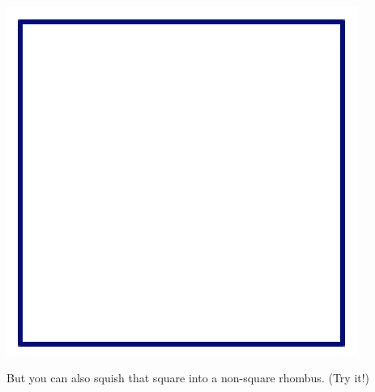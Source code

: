 \documentclass[12pt, reqno]{amsart}
\theoremstyle{remark}
\theoremstyle{definition}
\numberwithin{equation}{section}  %
\begin{document}
\begin{center}
\includegraphics[scale = .45]{square2}
\end{center}
But you can also squish that square into a non-square rhombus.  (Try it!)
\end{document}
